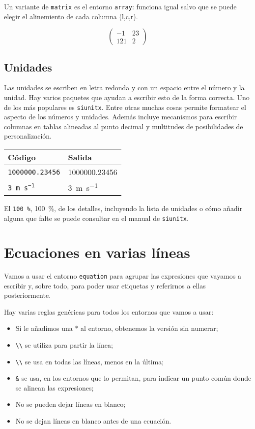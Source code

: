 \documentclass{article}
\numberwithin{equation}{section}
\theoremstyle{plain}
\theoremstyle{definition}
\theoremstyle{remark}
\begin{document}
Un variante de \texttt{matrix} es el entorno \texttt{array}: funciona igual salvo que se puede elegir el alinemiento de cada columna (l,c,r).
\begin{codigo-lado}
\[
\left(
\begin{array}{rc}
-1 & 23 \\
121 & 2
\end{array}
\right)
\]
\end{codigo-lado}

\subsection{Unidades}

Las unidades se escriben en letra redonda y con un espacio entre el número y la unidad. Hay varios paquetes que ayudan a escribir esto de la forma correcta. Uno de los más populares es \texttt{siunitx}. Entre otras muchas cosas permite formatear el aspecto de los números y unidades. Además incluye mecanismos para escribir columnas en tablas alineadas al punto decimal y multitudes de posibilidades de personalización.

\begin{table}[H]
\centering
\begin{tabular}{@{}ll@{}}
\toprule
Código & Salida \\
\midrule
\texttt{\num{1000000.23456}} & \num{1000000.23456} \\
\texttt{\SI{3}{\metre\per\second}} & \SI{3}{\metre\per\second} \\
\bottomrule
\end{tabular}
\end{table}
El \texttt{\SI{100}{\percent}}, \SI{100}{\percent}, de los detalles, incluyendo la lista de unidades o cómo añadir alguna que falte se puede consultar en el manual de \texttt{siunitx}.

\section{Ecuaciones en varias líneas}

Vamos a usar el entorno \texttt{equation} para agrupar las expresiones que vayamos a escribir y, sobre todo, para poder usar etiquetas y referirnos a ellas posteriormente. 

Hay varias reglas genéricas para todos los entornos que vamos a usar:
\begin{itemize}
	\item Si le añadimos una $*$ al entorno, obtenemos la versión sin numerar;
	\item \verb+\\+ se utiliza para partir la línea;
	\item \verb+\\+ se usa en todas las líneas, menos en la última;
	\item \verb+&+ se usa, en los entornos que lo permitan, para indicar un punto común donde se alinean las expresiones;
	\item No se pueden dejar líneas en blanco;
	\item No se dejan líneas en blanco antes de una ecuación.
\end{itemize}
\end{document}
